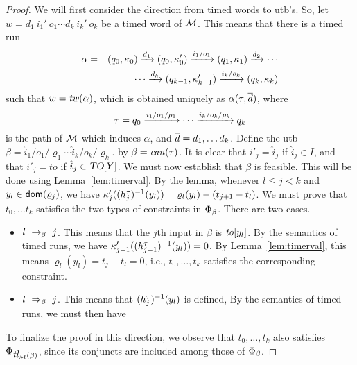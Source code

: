 \begin{proof}
  We will first consider the direction from timed words to utb's. So, let
  $w =  d_1 ~ i_1' ~ o_1 \cdots d_k ~ i_k' ~ o_k$ be a timed word of ${\mathcal M}$.
  This means that there is a timed run
  \begin{eqnarray*}
\alpha & = & (q_0,\kappa_0) \xrightarrow{d_1} (q_0,\kappa_0') \xrightarrow{i_1/o_1} (q_1,\kappa_1) \xrightarrow{d_2} 
\cdots
\\ && \qquad \cdots
\xrightarrow{d_k} (q_{k-1},\kappa_{k-1}') \xrightarrow{i_k/o_k} (q_k,\kappa_k)
\end{eqnarray*}
  such that $w = \mathit{tw}(\alpha)$, which is obtained uniquely as
$\alpha(\tau,\overline{d})$, where
  \[
  \tau = q_0 \xrightarrow{i_1/o_1/\rho_1}
\cdots
\xrightarrow{i_k/o_k/\rho_k} q_k
\]
is the path of ${\mathcal M}$ which induces $\alpha$,
and $\overline{d} = d_1, \ldots d_k$.
Define the utb
$\beta  =  {\hat{i}_1/o_1/\varrho_1}  \cdots {\hat{i}_k/o_k/\varrho_k}$.
by $\beta=\mathit{can}({\tau})$. It is clear that
$i'_j   =   \hat{i}_j$ if $\hat{i}_j \in I$, and that
$i'_j   = \mathit{to}$ if $\hat{i}_j \in \mbox{\sl TO}[Y]$. We must now establish
that $\beta$ is feasible. This will be done using Lemma~\ref{lem:timerval}.
By the lemma,
whenever $l \leq j < k$ and $y_l \in {\textsf{dom}}(\varrho_{j})$, we have
$\kappa_{j}'((h_{j}^{\tau})^{-1}(y_l)) = \varrho_l(y_l) - (t_{j+1} -t_l)$.
 We must prove that $t_0, \ldots t_k$ satisfies the two types of
 constraints in $\Phi_{\beta}$. There are two cases.
 \begin{itemize}
 \item $l \ \rightarrow_{\beta} \  j$. This means that the $j$th input in $\beta$ is
   $\mathit{to}[y_l]$. By the semantics of timed runs, we have
   $\kappa_{j-1}'((h_{j-1}^{\tau})^{-1}(y_l)) = 0$.
   By Lemma~\ref{lem:timerval}, this means
   $\varrho_l(y_l) = t_j - t_l = 0$, i.e.,
   $t_0, \ldots, t_k$ satisfies the corresponding constraint.
 \item $l \ \Rightarrow_{\beta}\  j$. This means that $(h_{j}^{\tau})^{-1}(y_l)$
   is defined, 
   By the semantics of timed runs, we must then have
\end{itemize}
 To finalize the proof in this direction, we observe that  $t_0, \ldots, t_k$
 also satisfies
$\Phi_{\mbox{\it tl}_{{\mathcal M}}({\beta})}$, since its conjuncts
are included among those of $\Phi_{\beta}$.


\end{proof}
